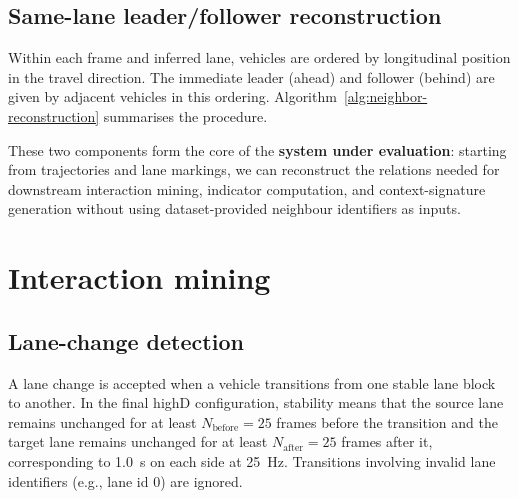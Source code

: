 \documentclass[12pt,a4paper,twoside,openright]{report}
\begin{document}
    \subsection{Same-lane leader/follower reconstruction}
    Within each frame and inferred lane, vehicles are ordered by longitudinal position in the travel direction. The immediate leader (ahead) and follower (behind) are given by adjacent vehicles in this ordering. Algorithm~\ref{alg:neighbor-reconstruction} summarises the procedure.

    \begin{algorithm}[H]
\caption{Same-lane leader/follower reconstruction from geometry}
\label{alg:neighbor-reconstruction}

    \end{algorithm}

    These two components form the core of the \textbf{system under evaluation}: starting from trajectories and lane markings, we can reconstruct the relations needed for downstream interaction mining, indicator computation, and context-signature generation without using dataset-provided neighbour identifiers as inputs.


    \section{Interaction mining}
    \subsection{Lane-change detection}
    A lane change is accepted when a vehicle transitions from one stable lane block to another. In the final highD configuration, stability means that the source lane remains unchanged for at least $N_\text{before}=25$ frames before the transition and the target lane remains unchanged for at least $N_\text{after}=25$ frames after it, corresponding to \SI{1.0}{\second} on each side at \SI{25}{\hertz}. Transitions involving invalid lane identifiers (e.g., lane id 0) are ignored.
\end{document}

